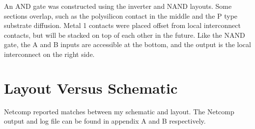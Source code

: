 \documentclass[11pt]{article}
\begin{document}
An AND gate was constructed using the inverter and NAND layouts. Some sections overlap, such as the polysilicon contact in the middle and the P type substrate diffusion. Metal 1 contacts were placed offset from local interconnect contacts, but will be stacked on top of each other in the future. Like the NAND gate, the A and B inputs are accessible at the bottom, and the output is the local interconnect on the right side.

\section*{Layout Versus Schematic}

Netcomp reported matches between my schematic and layout. The Netcomp output and log file can be found in appendix A and B respectively. 




\newpage
\end{document}
